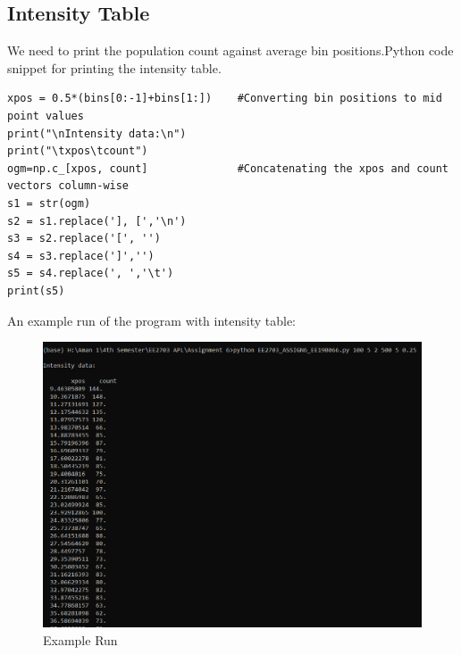 \documentclass[11pt, a4paper]{article}
\begin{document}
\subsection{Intensity Table}
    We need to print the population count against average bin positions.Python code snippet for printing the intensity table.
    \begin{verbatim}
xpos = 0.5*(bins[0:-1]+bins[1:])    #Converting bin positions to mid point values
print("\nIntensity data:\n")
print("\txpos\tcount")
ogm=np.c_[xpos, count]              #Concatenating the xpos and count vectors column-wise
s1 = str(ogm)
s2 = s1.replace('], [','\n')
s3 = s2.replace('[', '')
s4 = s3.replace(']','')
s5 = s4.replace(', ','\t')
print(s5)
    \end{verbatim}
    An example run of the program with intensity table:
    \begin{figure}[!h]
        \centering
        \includegraphics[scale = 0.6]{Figure 4.png}
        \caption{Example Run}
        \label{fig:my_label}
    \end{figure}
\end{document}
